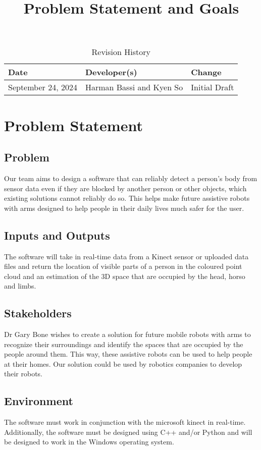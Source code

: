 \documentclass{article}
\title{Problem Statement and Goals\\\progname}
\author{\authname}
\date{}
\begin{document}
\maketitle

\begin{table}[hp]
\caption{Revision History} \label{TblRevisionHistory}
\begin{tabularx}{\textwidth}{llX}
\toprule
\textbf{Date} & \textbf{Developer(s)} & \textbf{Change}\\
\midrule
September 24, 2024 & Harman Bassi and Kyen So & Initial Draft\\
\bottomrule
\end{tabularx}
\end{table}

\section{Problem Statement}

\subsection{Problem}
Our team aims to design a software that can reliably detect a person’s body from sensor data even if they are blocked by another person or other objects, which existing solutions cannot reliably do so. This helps make future assistive robots with arms designed to help people in their daily lives much safer for the user.

\subsection{Inputs and Outputs}
The software will take in real-time data from a Kinect sensor or uploaded data files and return the location of visible parts of a person in the coloured point cloud and an estimation of the 3D space that are occupied by the head, horso and limbs.

\subsection{Stakeholders}
Dr Gary Bone wishes to create a solution for future mobile robots with arms to recognize their surroundings and identify the spaces that are occupied by the people around them. This way, these assistive robots can be used to help people at their homes. Our solution could be used by robotics companies to develop their robots.

\subsection{Environment}
The software must work in conjunction with the microsoft kinect in real-time. Additionally, the software must be designed using C++ and/or Python and will be designed to work in the Windows operating system.
\end{document}
